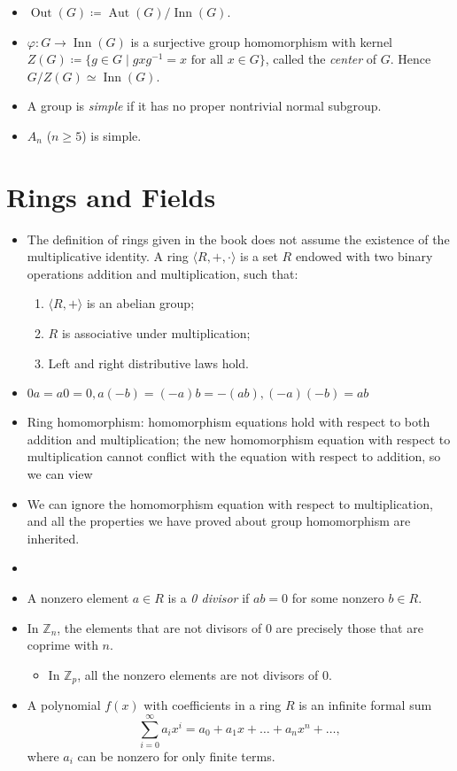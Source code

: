 \documentclass{article}
\newcommand{\Z}{\mathbb{Z}}
\newcommand{\aut}{\operatorname{Aut}}
\newcommand{\inn}{\operatorname{Inn}}
\renewcommand{\phi}{\varphi}
\begin{document}
\begin{itemize}
    \item $\operatorname{Out}(G) \coloneqq \aut(G)/\inn(G)$.
    \item $\phi: G \to \inn(G)$ is a surjective group homomorphism with kernel $Z(G) \coloneqq \{g \in G \mid g x g^{-1} = x \text{ for all } x \in G\}$, called the \textit{center} of $G$. Hence $G/Z(G) \simeq \inn(G)$.
    \item A group is \textit{simple} if it has no proper nontrivial normal subgroup.
    \item $A_n$ ($n \geq 5$) is simple.
\end{itemize}

\section{Rings and Fields}
\begin{itemize}
    \item The definition of rings given in the book does not assume the existence of the multiplicative identity. A ring $\langle R,+,\cdot \rangle$ is a set $R$ endowed with two binary operations addition and multiplication, such that:
    \begin{enumerate}[label=(\alph*)]
        \item $\langle R, + \rangle$ is an abelian group;
        \item $R$ is associative under multiplication;
        \item Left and right distributive laws hold.
    \end{enumerate}
    \item $0a = a0 = 0, a(-b)=(-a)b=-(ab), (-a)(-b)=ab$
    \item Ring homomorphism: homomorphism equations hold with respect to both addition and multiplication; the new homomorphism equation with respect to multiplication cannot conflict with the equation with respect to addition, so we can view 
    \item We can ignore the homomorphism equation with respect to multiplication, and all the properties we have proved about group homomorphism are inherited.
    \item 
    \item A nonzero element $a \in R$ is a \textit{0 divisor} if $ab = 0$ for some nonzero $b \in R$.
    \item In $\Z_n$, the elements that are not divisors of 0 are precisely those that are coprime with $n$.
    \begin{itemize}
        \item In $\Z_p$, all the nonzero elements are not divisors of 0.
    \end{itemize}
    \item A polynomial $f(x)$ with coefficients in a ring $R$ is an infinite formal sum $$\sum_{i=0}^\infty a_i x^i = a_0 + a_1 x + \dots + a_n x^n + \dots,$$ where $a_i$ can be nonzero for only finite terms.
    

\end{itemize}
\end{document}
